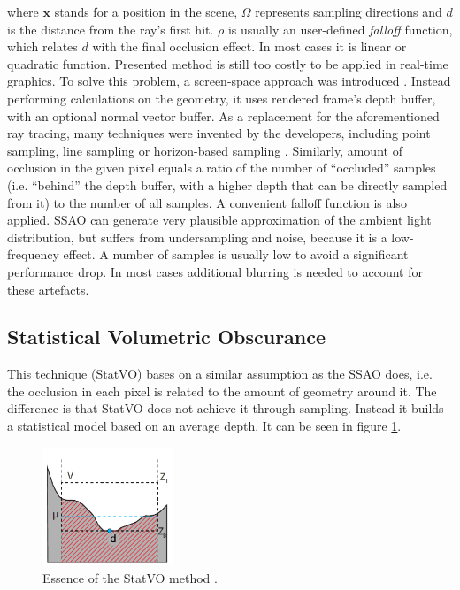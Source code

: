 \documentclass[10pt,journal,compsoc,twoside]{IEEEtran}
\begin{document}
	where \(\mathbf{x}\) stands for a position in the scene, \(\Omega\) represents sampling directions and \(d\) is the distance from the ray's first hit. \(\rho\) is usually an user-defined \textit{falloff} function, which relates \(d\) with the final occlusion effect. In most cases it is linear or quadratic function. Presented method is still too costly to be applied in real-time graphics. To solve this problem, a screen-space approach was introduced \cite{crytek}. Instead performing calculations on the geometry, it uses rendered frame's depth buffer, with an optional normal vector buffer. As a replacement for the aforementioned ray tracing, many techniques were invented by the developers, including point sampling, line sampling or horizon-based sampling \cite{statvo}. Similarly, amount of occlusion in the given pixel equals a ratio of the number of ``occluded'' samples (i.e. ``behind'' the depth buffer, with a higher depth that can be directly sampled from it) to the number of all samples. A convenient falloff function is also applied. SSAO can generate very plausible approximation of the ambient light distribution, but suffers from undersampling and noise, because it is a low-frequency effect. A number of samples is usually low to avoid a significant performance drop. In most cases additional blurring is needed to account for these artefacts.
	
	\subsection{Statistical Volumetric Obscurance}\label{t:related:statvo}
	
	This technique (StatVO) bases on a similar assumption as the SSAO does, i.e. the occlusion in each pixel is related to the amount of geometry around it. The difference is that StatVO does not achieve it through sampling. Instead it builds a statistical model based on an average depth. It can be seen in figure \ref{fig:2_B}.
	
	\begin{figure}[ht]
		\centering
		\includegraphics[width=0.35\textwidth]{fig_2_B.png}
		\caption{Essence of the StatVO method \cite{statvo}.}
		\label{fig:2_B}
	\end{figure}
\end{document}
